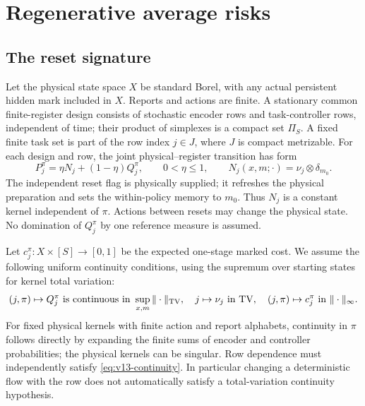 \section{Regenerative average risks}\label{sec:v13-regeneration}
\subsection{The reset signature}
Let the physical state space $X$ be standard Borel, with any actual
persistent hidden mark included in $X$. Reports and actions are finite.
A stationary common finite-register design consists of stochastic
encoder rows and task-controller rows, independent of time; their
product of simplexes is a compact set $\Pi_S$. A fixed finite task set
is part of the row index $j\in J$, where $J$ is compact metrizable.
For each design and row, the joint physical--register transition has
form
\begin{equation}\label{eq:v13-reset}
 P_j^\pi=\eta N_j+(1-\eta)Q_j^\pi,\qquad 0<\eta\le1,
 \qquad N_j(x,m;\cdot)=\nu_j\otimes\delta_{m_0}.
\end{equation}
The independent reset flag is physically supplied; it refreshes the
physical preparation and sets the within-policy memory to $m_0$.
Thus $N_j$ is a constant kernel independent of $\pi$. Actions between
resets may change the physical state. No domination of $Q_j^\pi$ by
one reference measure is assumed.

Let $c_j^\pi:X\times[S]\to[0,1]$ be the expected one-stage marked
cost. We assume the following uniform continuity conditions, using the
supremum over starting states for kernel total variation:
\begin{equation}\label{eq:v13-continuity}
 (j,\pi)\mapsto Q_j^\pi\text{ is continuous in }\sup_{x,m}\|\cdot\|_{\rm TV},
 \quad j\mapsto\nu_j\text{ in TV},\quad
 (j,\pi)\mapsto c_j^\pi\text{ in }\|\cdot\|_\infty.
\end{equation}
For fixed physical kernels with finite action and report alphabets,
continuity in $\pi$ follows directly by expanding the finite sums of
encoder and controller probabilities; the physical kernels can be
singular. Row dependence must independently satisfy
\eqref{eq:v13-continuity}. In particular changing a deterministic flow
with the row does not automatically satisfy a total-variation
continuity hypothesis.


